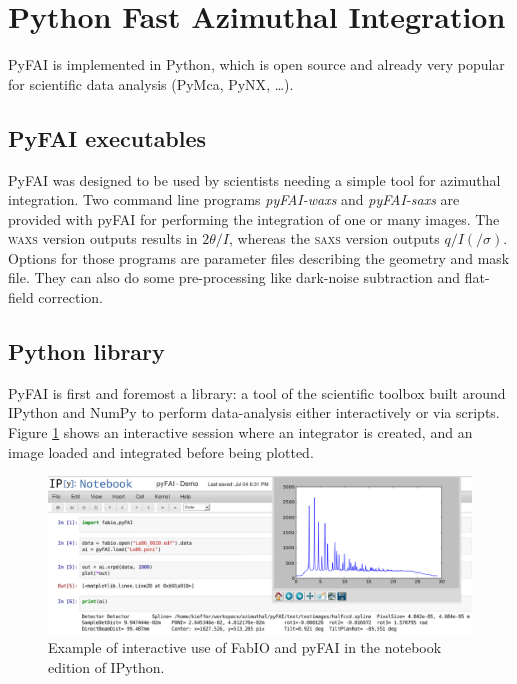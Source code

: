 \documentclass[a4paper]{jpconf}
\begin{document}
\section{Python Fast Azimuthal Integration}
PyFAI is implemented in Python, which is open
source and already very popular for scientific data analysis (PyMca\cite{pymca},
PyNX\cite{pynx}, \ldots).

\subsection{PyFAI executables}
PyFAI was designed to be used by scientists needing a simple tool for azimuthal
integration. Two command line programs \textit{pyFAI-waxs} and
\textit{pyFAI-saxs} are provided with pyFAI for performing the
integration of one or many images. The \textsc{waxs} version outputs results in
$2\theta /I$,  whereas the \textsc{saxs} version outputs $q/I(/\sigma )$.
Options for those programs are parameter files describing the geometry and mask file. They can
also do some pre-processing like dark-noise subtraction and flat-field correction.

\subsection{Python library}
PyFAI is first and foremost a library: a tool of the scientific
toolbox built around IPython\cite{ipython} and NumPy\cite{numpy} to
perform data-analysis either interactively or via scripts.
Figure \ref{notebook} shows an interactive session where an integrator is
created, and an image loaded and integrated before being plotted.

\begin{figure}[h]
\begin{center}
\includegraphics[width=15cm]{img/notebook-l.eps}
\caption{\label{notebook} Example of interactive use of FabIO and pyFAI in the
notebook edition of IPython.}
\end{center}
\end{figure}
\end{document}
